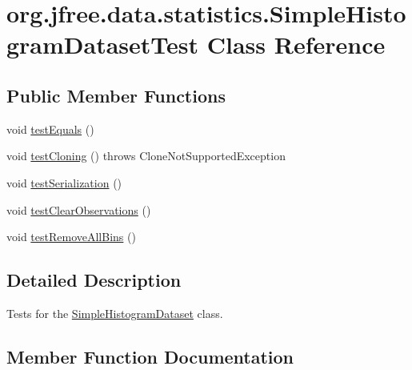 \hypertarget{classorg_1_1jfree_1_1data_1_1statistics_1_1_simple_histogram_dataset_test}{}\section{org.\+jfree.\+data.\+statistics.\+Simple\+Histogram\+Dataset\+Test Class Reference}
\label{classorg_1_1jfree_1_1data_1_1statistics_1_1_simple_histogram_dataset_test}
\subsection*{Public Member Functions}
\begin{DoxyCompactItemize}
\item 
void \mbox{\hyperlink{classorg_1_1jfree_1_1data_1_1statistics_1_1_simple_histogram_dataset_test_acc941eac46bff79f70dc6442aaec53af}{test\+Equals}} ()
\item 
void \mbox{\hyperlink{classorg_1_1jfree_1_1data_1_1statistics_1_1_simple_histogram_dataset_test_a0e56263c812c989e9ba36123d4e53b9a}{test\+Cloning}} ()  throws Clone\+Not\+Supported\+Exception 
\item 
void \mbox{\hyperlink{classorg_1_1jfree_1_1data_1_1statistics_1_1_simple_histogram_dataset_test_aa61d59f1842959a103fd59f7cccbc0c2}{test\+Serialization}} ()
\item 
void \mbox{\hyperlink{classorg_1_1jfree_1_1data_1_1statistics_1_1_simple_histogram_dataset_test_a34a812830a4809270d4df322b0f729db}{test\+Clear\+Observations}} ()
\item 
void \mbox{\hyperlink{classorg_1_1jfree_1_1data_1_1statistics_1_1_simple_histogram_dataset_test_a93cbfc462acf3d597092e309397da999}{test\+Remove\+All\+Bins}} ()
\end{DoxyCompactItemize}


\subsection{Detailed Description}
Tests for the \mbox{\hyperlink{classorg_1_1jfree_1_1data_1_1statistics_1_1_simple_histogram_dataset}{Simple\+Histogram\+Dataset}} class. 

\subsection{Member Function Documentation}
\mbox{\label{classorg_1_1jfree_1_1data_1_1statistics_1_1_simple_histogram_dataset_test_a34a812830a4809270d4df322b0f729db}} 
